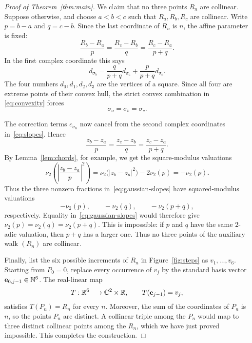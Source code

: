 \documentclass[12pt,reqno]{article}
\newcommand{\N}{\mathbb N}
\newcommand{\vTwo}{\nu_2}
\begin{document}
\begin{proof}[Proof of Theorem~\ref{thm:main}]
We claim that no three points $R_n$ are collinear.  Suppose otherwise, and
choose $a<b<c$ such that $R_a,R_b,R_c$ are collinear.  Write
$p=b-a$ and $q=c-b$.  Since the last coordinate of $R_n$ is $n$, the affine
parameter is fixed:
\begin{equation}\label{eq:slopes}
 \frac{R_b-R_a}{p}
 =\frac{R_c-R_b}{q}
 =\frac{R_c-R_a}{p+q}.
\end{equation}
In the first complex coordinate this says
\begin{equation}\label{eq:convexity}
 d_{\sigma_b}
 =\frac{q}{p+q}d_{\sigma_a}
  +\frac{p}{p+q}d_{\sigma_c}.
\end{equation}
The four numbers $d_0,d_1,d_2,d_3$ are the vertices of a square. Since all four are extreme points of their convex hull, the strict convex combination in
\eqref{eq:convexity} forces
\begin{equation}\label{eq:equal-states}
 \sigma_a=\sigma_b=\sigma_c.
\end{equation}

The correction terms $c_{\sigma_n}$ now cancel from the second complex
coordinates in~\eqref{eq:slopes}.  Hence
\begin{equation}\label{eq:gaussian-slopes}
 \frac{z_b-z_a}{p}
 =\frac{z_c-z_b}{q}
 =\frac{z_c-z_a}{p+q}.
\end{equation}
By Lemma~\ref{lem:chords}, for example, we get the square-modulus valuations
\[
 \vTwo\!\left(\left|\frac{z_b-z_a}{p}\right|^2\right)
 =\vTwo\bigl(|z_b-z_a|^2\bigr)-2\vTwo(p)=-\vTwo(p).
\]
Thus the three nonzero fractions in~\eqref{eq:gaussian-slopes} have
squared-modulus valuations
\begin{equation}\label{eq:slope-valuations}
 -\vTwo(p),\qquad -\vTwo(q),\qquad -\vTwo(p+q),
\end{equation}
respectively.  Equality in~\eqref{eq:gaussian-slopes} would therefore give
\(
 \vTwo(p)=\vTwo(q)=\vTwo(p+q).
\)
This is impossible: if $p$ and $q$ have the same $2$-adic valuation, then
$p+q$ has a larger one.  Thus no three points of the auxiliary walk $(R_n)$ are collinear.

Finally, list the six possible increments of $R_n$ in Figure~\ref{fig:steps} as
$v_1,\ldots,v_6$.  Starting from $P_0=0$, replace every occurrence of $v_j$
by the standard basis vector ${\bf e}_{6, j-1}\in\N^6$.  The real-linear map
\[
 T:\mathbb R^6\longrightarrow\mathbb C^2\times\mathbb R,
 \qquad T({\bf e}_{j-1})=v_j,
\]
satisfies $T(P_n)=R_n$ for every $n$.  Moreover, the sum of the coordinates of $P_n$ is $n$, so the
points $P_n$ are distinct.  A collinear triple among
the $P_n$ would map to three distinct collinear points among the $R_n$, which
we have just proved impossible.  This completes the construction.
\end{proof}
\end{document}
